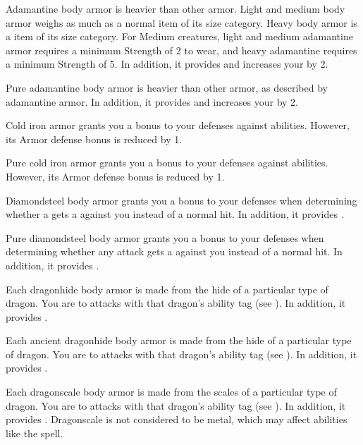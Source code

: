       Adamantine body armor is heavier than other armor.
      Light and medium body armor weighs as much as a normal item of its size category.
      Heavy body armor is a  item of its size category.
      For Medium creatures, light and medium adamantine armor requires a minimum Strength of 2 to wear, and heavy adamantine requires a minimum Strength of 5.
      In addition, it provides   and increases your  by 2.

       Pure adamantine body armor is heavier than other armor, as described by adamantine armor.
      In addition, it provides   and increases your  by 2.

       Cold iron armor grants you a  bonus to your defenses against \magical abilities.
      However, its Armor defense bonus is reduced by 1.

       Pure cold iron armor grants you a  bonus to your defenses against \magical abilities.
      However, its Armor defense bonus is reduced by 1.

       Diamondsteel body armor grants you a  bonus to your defenses when determining whether a  gets a  against you instead of a normal hit.
      In addition, it provides  .

       Pure diamondsteel body armor grants you a  bonus to your defenses when determining whether any attack gets a  against you instead of a normal hit.
      In addition, it provides  .

       Each dragonhide body armor is made from the hide of a particular type of dragon.
      You are  to attacks with that dragon's ability tag (see ).
      In addition, it provides  .

       Each ancient dragonhide body armor is made from the hide of a particular type of dragon.
      You are  to attacks with that dragon's ability tag (see ).
      In addition, it provides  .

       Each dragonscale body armor is made from the scales of a particular type of dragon.
      You are  to attacks with that dragon's ability tag (see ).
      In addition, it provides  .
      Dragonscale is not considered to be metal, which may affect abilities like the  spell.

